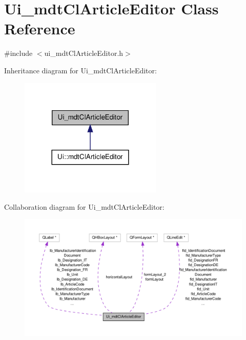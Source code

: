 \hypertarget{class_ui__mdt_cl_article_editor}{\section{Ui\-\_\-mdt\-Cl\-Article\-Editor Class Reference}
\label{class_ui__mdt_cl_article_editor}
}


{\ttfamily \#include $<$ui\-\_\-mdt\-Cl\-Article\-Editor.\-h$>$}



Inheritance diagram for Ui\-\_\-mdt\-Cl\-Article\-Editor\-:
\nopagebreak
\begin{figure}[H]
\begin{center}
\leavevmode
\includegraphics[width=192pt]{class_ui__mdt_cl_article_editor__inherit__graph}
\end{center}
\end{figure}


Collaboration diagram for Ui\-\_\-mdt\-Cl\-Article\-Editor\-:
\nopagebreak
\begin{figure}[H]
\begin{center}
\leavevmode
\includegraphics[width=350pt]{class_ui__mdt_cl_article_editor__coll__graph}
\end{center}
\end{figure}
